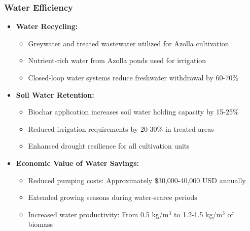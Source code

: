 \subsubsection{Water Efficiency}
\begin{itemize}
    \item \textbf{Water Recycling:}
    \begin{itemize}
        \item Greywater and treated wastewater utilized for Azolla cultivation
        \item Nutrient-rich water from Azolla ponds used for irrigation
        \item Closed-loop water systems reduce freshwater withdrawal by 60-70\%
    \end{itemize}
    
    \item \textbf{Soil Water Retention:}
    \begin{itemize}
        \item Biochar application increases soil water holding capacity by 15-25\%
        \item Reduced irrigation requirements by 20-30\% in treated areas
        \item Enhanced drought resilience for all cultivation units
    \end{itemize}
    
    \item \textbf{Economic Value of Water Savings:}
    \begin{itemize}
        \item Reduced pumping costs: Approximately \$30,000-40,000 USD annually
        \item Extended growing seasons during water-scarce periods
        \item Increased water productivity: From 0.5 kg/m$^3$ to 1.2-1.5 kg/m$^3$ of biomass
    \end{itemize}
\end{itemize}

